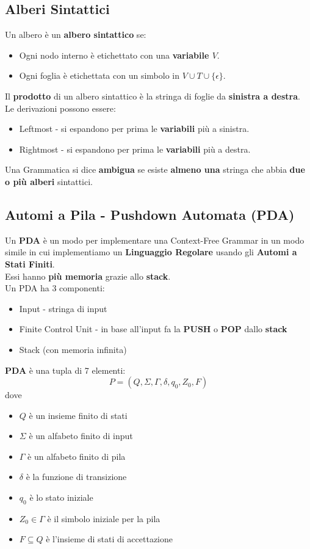 \documentclass[12pt]{article}
\begin{document}
\subsection{Alberi Sintattici}
Un albero è un \textbf{albero sintattico} se:
\begin{itemize}
    \item Ogni nodo interno è etichettato con una \textbf{variabile $V$}.
    \item Ogni foglia è etichettata con un simbolo in $V \cup T \cup \{\epsilon\}$.
\end{itemize}
Il \textbf{prodotto} di un albero sintattico è la stringa di foglie da \textbf{sinistra a destra}.\\
Le derivazioni possono essere:
\begin{itemize}
    \item Leftmost - si espandono per prima le \textbf{variabili} più a sinistra.
    \item Rightmost - si espandono per prima le \textbf{variabili} più a destra.
\end{itemize}
Una Grammatica si dice \textbf{ambigua} se esiste \textbf{almeno una} stringa che abbia \textbf{due o più alberi} sintattici.

\subsection{Automi a Pila - Pushdown Automata (PDA)}
Un \textbf{PDA} è un modo per implementare una Context-Free Grammar in un modo simile in cui implementiamo un \textbf{Linguaggio Regolare} usando gli \textbf{Automi a Stati Finiti}.\\
Essi hanno \textbf{più memoria} grazie allo \textbf{stack}.\\
Un PDA ha 3 componenti:
\begin{itemize}
    \item Input - stringa di input
    \item Finite Control Unit - in base all'input fa la \textbf{PUSH} o \textbf{POP} dallo \textbf{stack}
    \item Stack (con memoria infinita)
\end{itemize}
\textbf{PDA} è una tupla di 7 elementi:
\begin{equation*}
    P=(Q,\Sigma,\Gamma,\delta,q_0,Z_0,F)
\end{equation*}
dove
\begin{itemize}
    \item $Q$ è un insieme finito di stati
    \item $\Sigma$ è un alfabeto finito di input
    \item $\Gamma$ è un alfabeto finito di pila
    \item $\delta$ è la funzione di transizione
    \item $q_0$ è lo stato iniziale
    \item $Z_0 \in \Gamma$ è il simbolo iniziale per la pila
    \item $F \subseteq Q$ è l'insieme di stati di accettazione  
\end{itemize}
\end{document}
